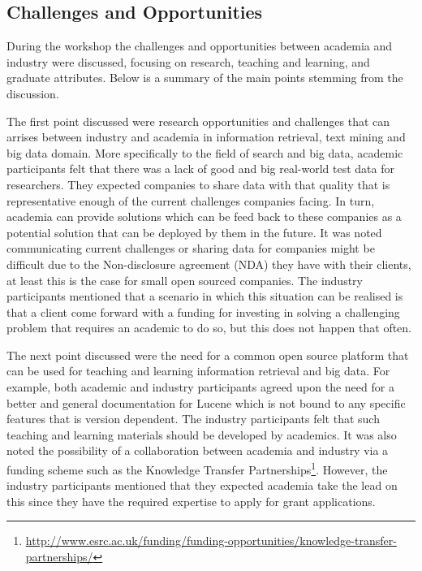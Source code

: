 
\subsection{Challenges and Opportunities}
During the workshop the challenges and opportunities between academia and industry were discussed, focusing on research, teaching and learning, and graduate attributes. Below is a summary of the main points stemming from the discussion.

The first point discussed were research opportunities and challenges that can arrises between industry and academia in information retrieval, text mining and big data domain. 
More specifically to the field of search and big data, academic participants felt that there was a lack of good and big real-world test data for researchers. 
They expected companies to share data with that quality that is representative enough of the current challenges companies facing. 
In turn, academia can provide solutions which can be feed back to these companies as a potential solution that can be deployed by them in the future.  
It was noted communicating current challenges or sharing data for companies might be difficult due to the Non-disclosure agreement (NDA) they have with their clients, at least this is the case for small open sourced companies. 
The industry participants mentioned that a scenario in which this situation can be realised is that a client come forward with a funding for investing in solving a challenging problem that requires an academic to do so, but this does not happen that often. 

The next point discussed were the need for a common open source platform that can be used for teaching and learning information retrieval and big data. 
For example, both academic and industry participants agreed upon the need for a better and general documentation for Lucene which is not bound to any specific features that is version dependent. 
The industry participants felt that such teaching and learning materials should be developed by academics. 
It was also noted the possibility of a collaboration between academia and industry via a funding scheme such as the Knowledge Transfer Partnerships\footnote{\scriptsize{\url{http://www.esrc.ac.uk/funding/funding-opportunities/knowledge-transfer-partnerships/}}}. 
However, the industry participants mentioned that they expected academia take the lead on this since they have the required expertise to apply for grant applications. 

